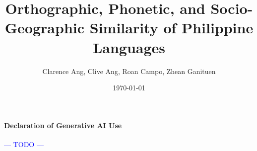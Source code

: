 \documentclass[twocolumn]{article}
\title{Orthographic, Phonetic, and Socio-Geographic Similarity of Philippine Languages}
\author{Clarence Ang, Clive Ang, Roan Campo, Zhean Ganituen}
\date{\today}
\newcommand{\todo}{\textcolor{blue}{--- TODO ---}}
\begin{document}
\maketitle







\vfill 
\paragraph{Declaration of Generative AI Use} \todo
\end{document}
